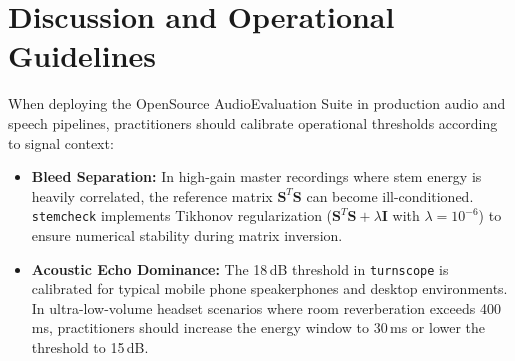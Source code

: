 \documentclass[10pt,journal,compsoc]{IEEEtran}
\begin{document}
\begin{table}[t]
\centering
\caption{Quantitative Benchmark Results on MUSDB18-HQ and MagicHub Corpora (95\% Bootstrap Confidence Intervals).}
\label{tab:benchmark_results}
\end{table}

\section{Discussion and Operational Guidelines}
When deploying the OpenSource AudioEvaluation Suite in production audio and speech pipelines, practitioners should calibrate operational thresholds according to signal context:
\begin{itemize}
    \item \textbf{Bleed Separation:} In high-gain master recordings where stem energy is heavily correlated, the reference matrix $\mathbf{S}^T \mathbf{S}$ can become ill-conditioned. \texttt{stemcheck} implements Tikhonov regularization ($\mathbf{S}^T \mathbf{S} + \lambda \mathbf{I}$ with $\lambda = 10^{-6}$) to ensure numerical stability during matrix inversion.
    \item \textbf{Acoustic Echo Dominance:} The 18\,dB threshold in \texttt{turnscope} is calibrated for typical mobile phone speakerphones and desktop environments. In ultra-low-volume headset scenarios where room reverberation exceeds 400\,ms, practitioners should increase the energy window to 30\,ms or lower the threshold to 15\,dB.
\end{itemize}
\end{document}
